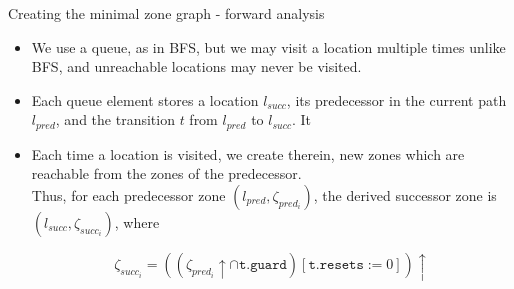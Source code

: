 \documentclass{beamer}
\begin{document}
\begin{frame}{Creating the minimal zone graph - forward analysis}

\begin{itemize}

\item We use a queue, as in BFS, but we may visit a location multiple
  times unlike BFS, and unreachable locations may never be visited.

\item Each queue element stores a location
$l_{succ}$, its predecessor in the current path $l_{pred}$, and the
transition $t$ from $l_{pred}$ to $l_{succ}$. It

\item Each time a location
is visited, we create therein, new zones which are reachable from the
zones of the predecessor. \\
Thus, for each predecessor zone $(l_{pred}, \zeta _{pred_{i}})$, the
derived successor zone is $(l_{succ}, \zeta _{succ_{i}})$, where

\begin{displaymath} 
  \zeta _{succ_{i}} = ((\zeta _{pred_{i}} \uparrow \cap \texttt{t.guard})[\texttt{t.resets} := 0]) \uparrow
\end{displaymath} 

\end{itemize}

\end{frame}
\end{document}
